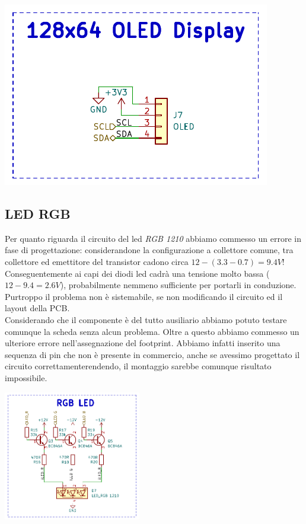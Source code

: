 \begin{center}
\includegraphics[scale=0.7]{figures/image58.png}
\captionsetup{type=figure}
\end{center}

\hypertarget{led-rgb}{%
\subsection{\texorpdfstring{LED RGB}{LED RGB}}\label{led-rgb}}

Per quanto riguarda il circuito del led \emph{RGB 1210} abbiamo commesso
un errore in fase di progettazione: considerandone la configurazione a collettore comune, tra
collettore ed emettitore del transistor cadono circa
$12-(3.3-0.7)=9.4V$!\\
Conseguentemente ai capi dei diodi led cadrà una tensione molto bassa ($12-9.4=2.6V$),
probabilmente nemmeno sufficiente per portarli in conduzione.\\
Purtroppo il problema non è sistemabile, se non modificando il circuito
ed il layout della PCB.\\
Considerando che il componente è del tutto ausiliario abbiamo potuto
testare comunque la scheda senza alcun problema.
Oltre a questo abbiamo commesso un ulteriore errore nell'assegnazione del footprint. Abbiamo infatti inserito una sequenza di pin che non è presente in commercio, anche se avessimo progettato il circuito correttamenterendendo, il montaggio sarebbe comunque risultato impossibile.

\begin{center}
\includegraphics[width=0.45\textwidth]{figures/image17.png}
\captionsetup{type=figure}
\end{center}

